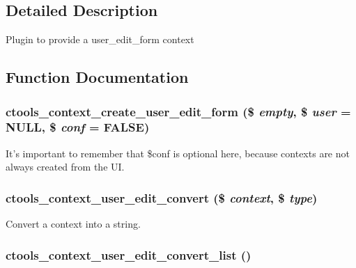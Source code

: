\subsection{Detailed Description}
Plugin to provide a user\_\-edit\_\-form context 

\subsection{Function Documentation}
\hypertarget{user__edit__form_8inc_a7fe780a0756ef2a10866ac3c11426ee7}{
\subsubsection[{ctools\_\-context\_\-create\_\-user\_\-edit\_\-form}]{\setlength{\rightskip}{0pt plus 5cm}ctools\_\-context\_\-create\_\-user\_\-edit\_\-form (\$ {\em empty}, \/  \$ {\em user} = {\ttfamily NULL}, \/  \$ {\em conf} = {\ttfamily FALSE})}}
\label{user__edit__form_8inc_a7fe780a0756ef2a10866ac3c11426ee7}
It's important to remember that \$conf is optional here, because contexts are not always created from the UI. \hypertarget{user__edit__form_8inc_a46277399c3f62b388d6d24236d39e6fa}{
\subsubsection[{ctools\_\-context\_\-user\_\-edit\_\-convert}]{\setlength{\rightskip}{0pt plus 5cm}ctools\_\-context\_\-user\_\-edit\_\-convert (\$ {\em context}, \/  \$ {\em type})}}
\label{user__edit__form_8inc_a46277399c3f62b388d6d24236d39e6fa}
Convert a context into a string. \hypertarget{user__edit__form_8inc_a961f6f629f3ba7c8ac2ba09b098f436c}{
\subsubsection[{ctools\_\-context\_\-user\_\-edit\_\-convert\_\-list}]{\setlength{\rightskip}{0pt plus 5cm}ctools\_\-context\_\-user\_\-edit\_\-convert\_\-list ()}}
